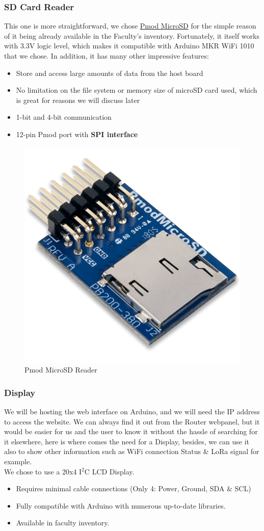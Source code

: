 \subsubsection{SD Card Reader}
This one is more straightforward, we chose \href{https://digilent.com/shop/pmod-microsd-microsd-card-slot/}{Pmod MicroSD} for the simple reason of it being already available in the Faculty's inventory. Fortunately, it itself works with 3.3V logic level, which makes it compatible with Arduino MKR WiFi 1010 that we chose. In addition, it has many other impressive features:
\begin{itemize}
    \item Store and access large amounts of data from the host board
    \item No limitation on the file system or memory size of microSD card used, which is great for reasons we will discuss later
    \item 1-bit and 4-bit communication
    \item 12-pin Pmod port with \textbf{SPI interface}
\end{itemize}

\begin{figure}[H]
    \centering
    \includegraphics[height=.3\textwidth]{images/components/pmod_microsd_reader.png}
    \caption{Pmod MicroSD Reader}
\end{figure}

\subsubsection{Display}
We will be hosting the web interface on Arduino, and we will need the IP address to access the website. We can always find it out from the Router webpanel, but it would be easier for us and the user to know it without the hassle of searching for it elsewhere, here is where comes the need for a Display, besides, we can use it also to show other information such as WiFi connection Status \& LoRa signal for example. \\
We chose to use a 20x4 I$^2$C LCD Display.
\begin{itemize}
    \item Requires minimal cable connections (Only 4: Power, Ground, SDA \& SCL)
    \item Fully compatible with Arduino with numerous up-to-date libraries.
    \item Available in faculty inventory.
\end{itemize}

